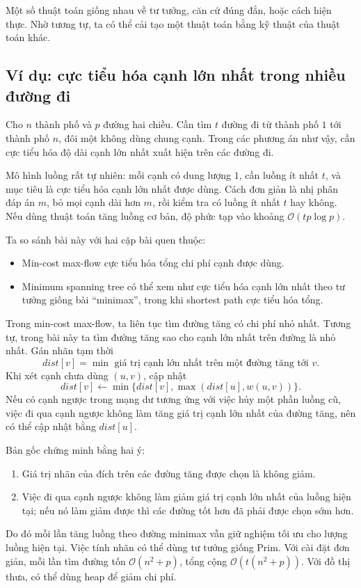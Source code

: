\documentclass[11pt]{article}
\newcommand{\Oh}{\mathcal{O}}
\begin{document}
Một số thuật toán giống nhau về tư tưởng, căn cứ đúng đắn, hoặc cách hiện
thực. Nhờ tương tự, ta có thể cải tạo một thuật toán bằng kỹ thuật của thuật
toán khác.

\subsection{Ví dụ: cực tiểu hóa cạnh lớn nhất trong nhiều đường đi}

Cho \(n\) thành phố và \(p\) đường hai chiều. Cần tìm \(t\) đường đi từ thành
phố \(1\) tới thành phố \(n\), đôi một không dùng chung cạnh. Trong các phương
án như vậy, cần cực tiểu hóa độ dài cạnh lớn nhất xuất hiện trên các đường đi.

Mô hình luồng rất tự nhiên: mỗi cạnh có dung lượng \(1\), cần luồng ít nhất
\(t\), và mục tiêu là cực tiểu hóa cạnh lớn nhất được dùng. Cách đơn giản là
nhị phân đáp án \(m\), bỏ mọi cạnh dài hơn \(m\), rồi kiểm tra có luồng ít
nhất \(t\) hay không. Nếu dùng thuật toán tăng luồng cơ bản, độ phức tạp vào
khoảng \(\Oh(tp\log p)\).

Ta so sánh bài này với hai cặp bài quen thuộc:
\begin{itemize}
  \item Min-cost max-flow cực tiểu hóa tổng chi phí cạnh được dùng.
  \item Minimum spanning tree có thể xem như cực tiểu hóa cạnh lớn nhất theo
  tư tưởng giống bài ``minimax'', trong khi shortest path cực tiểu hóa tổng.
\end{itemize}
Trong min-cost max-flow, ta liên tục tìm đường tăng có chi phí nhỏ nhất. Tương
tự, trong bài này ta tìm đường tăng sao cho cạnh lớn nhất trên đường là nhỏ
nhất. Gán nhãn tạm thời
\[
  dist[v]=\min \text{ giá trị cạnh lớn nhất trên một đường tăng tới } v.
\]
Khi xét cạnh chưa dùng \((u,v)\), cập nhật
\[
  dist[v]\leftarrow
  \min\{dist[v],\max(dist[u],w(u,v))\}.
\]
Nếu có cạnh ngược trong mạng dư tương ứng với việc hủy một phần luồng cũ, việc
đi qua cạnh ngược không làm tăng giá trị cạnh lớn nhất của đường tăng, nên có
thể cập nhật bằng \(dist[u]\).

Bản gốc chứng minh bằng hai ý:
\begin{enumerate}
  \item Giá trị nhãn của đích trên các đường tăng được chọn là không giảm.
  \item Việc đi qua cạnh ngược không làm giảm giá trị cạnh lớn nhất của luồng
  hiện tại; nếu nó làm giảm được thì các đường tốt hơn đã phải được chọn sớm
  hơn.
\end{enumerate}
Do đó mỗi lần tăng luồng theo đường minimax vẫn giữ nghiệm tối ưu cho lượng
luồng hiện tại. Việc tính nhãn có thể dùng tư tưởng giống Prim. Với cài đặt
đơn giản, mỗi lần tìm đường tốn \(\Oh(n^2+p)\), tổng cộng
\(\Oh(t(n^2+p))\). Với đồ thị thưa, có thể dùng heap để giảm chi phí.
\end{document}
